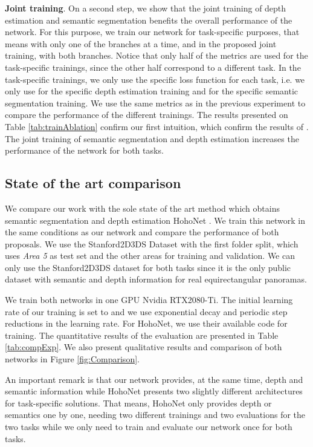 \documentclass[letterpaper, 10 pt, conference]{ieeeconf}
\begin{document}
\textbf{Joint training}. On a second step, we show that the joint training of depth estimation and semantic segmentation benefits the overall performance of the network.
For this purpose, we train our network for task-specific purposes, that means with only one of the branches at a time, and in the proposed joint training, with both branches. Notice that only half of the metrics are used for the task-specific trainings, since the other half correspond to a different task. In the task-specific trainings, we only use the specific loss function for each task, i.e. we only use  for the specific depth estimation training and  for the specific semantic segmentation training. We use the same metrics as in the previous experiment to compare the performance of the different trainings. 
The results presented on Table \ref{tab:trainAblation} confirm our first intuition, which confirm the results of \cite{zhang2018joint}. The joint training of semantic segmentation and depth estimation increases the performance of the network for both tasks.

\subsection{State of the art comparison}
We compare our work with the sole state of the art method which obtains semantic segmentation and depth estimation HohoNet \cite{sun2021hohonet}. We train this network in the same conditions as our network and compare the performance of both proposals. 
We use the Stanford2D3DS Dataset \cite{armeni2017joint} with the first folder split, which uses \textit{Area 5} as test set and the other areas for training and validation. We can only use the Stanford2D3DS dataset for both tasks since it is the only public dataset with semantic and depth information for real equirectangular panoramas.

We train both networks in one GPU Nvidia RTX2080-Ti. The initial learning rate of our training is set to  and we use exponential decay and periodic step reductions in the learning rate. For HohoNet\cite{sun2021hohonet}, we use their available code for training. The quantitative results of the evaluation are presented in Table \ref{tab:compExp}. We also present qualitative results and comparison of both networks in Figure \ref{fig:Comparison}.

An important remark is that our network provides, at the same time, depth and semantic information while HohoNet presents two slightly different architectures for task-specific solutions. 
That means, HohoNet only provides depth or semantics one by one, needing two different trainings and two evaluations for the two tasks while we only need to train and evaluate our network once for both tasks.
\end{document}
